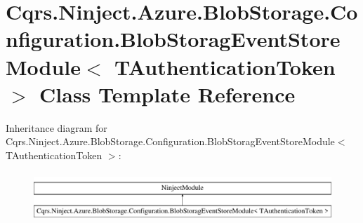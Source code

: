 \hypertarget{classCqrs_1_1Ninject_1_1Azure_1_1BlobStorage_1_1Configuration_1_1BlobStoragEventStoreModule}{}\section{Cqrs.\+Ninject.\+Azure.\+Blob\+Storage.\+Configuration.\+Blob\+Storag\+Event\+Store\+Module$<$ T\+Authentication\+Token $>$ Class Template Reference}
\label{classCqrs_1_1Ninject_1_1Azure_1_1BlobStorage_1_1Configuration_1_1BlobStoragEventStoreModule}
Inheritance diagram for Cqrs.\+Ninject.\+Azure.\+Blob\+Storage.\+Configuration.\+Blob\+Storag\+Event\+Store\+Module$<$ T\+Authentication\+Token $>$\+:\begin{figure}[H]
\begin{center}
\leavevmode
\includegraphics[height=1.882353cm]{classCqrs_1_1Ninject_1_1Azure_1_1BlobStorage_1_1Configuration_1_1BlobStoragEventStoreModule}
\end{center}
\end{figure}
